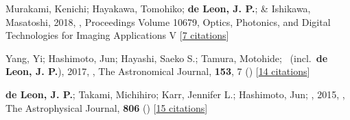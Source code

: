 \item[{\color{numcolor}\scriptsize3}] Murakami, Kenichi; Hayakawa, Tomohiko; \textbf{de Leon, J. P.}; \& Ishikawa, Masatoshi, 2018, , Proceedings Volume 10679, Optics, Photonics, and Digital Technologies for Imaging Applications V [\href{https://www.spiedigitallibrary.org/conference-proceedings-of-spie/10679/2306621/Real-time-high-speed-motion-blur-compensation-method-using-galvanometer/10.1117/12.2306621.short}{7 citations}]

\item[{\color{numcolor}\scriptsize2}] Yang, Yi; Hashimoto, Jun; Hayashi, Saeko S.; Tamura, Motohide; \etal\ (incl.\ \textbf{de Leon, J. P.}), 2017, , The Astronomical Journal, \textbf{153}, 7 () [\href{https://ui.adsabs.harvard.edu/abs/2017AJ....153....7Y}{14 citations}]

\item[{\color{numcolor}\scriptsize1}] \textbf{de Leon, J. P.}; Takami, Michihiro; Karr, Jennifer L.; Hashimoto, Jun; \etal, 2015, , The Astrophysical Journal, \textbf{806} () [\href{https://ui.adsabs.harvard.edu/abs/2015ApJ...806L..10D}{15 citations}]